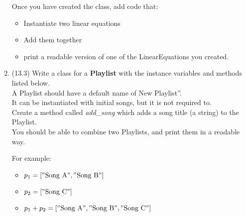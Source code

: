 \documentclass{article}
\newcommand{\csq}[1]{\reflectbox{''}#1''}  %
\newcommand{\csqt}[1]{\text{\reflectbox{''}#1''}}  %
\begin{document}
\begin{enumerate}
		Once you have created the class, add code that:
		\begin{itemize}
			\item Instantiate two linear equations
			\item Add them together
			\item print a readable version of one of the LinearEquations you created.
		\end{itemize}



\item (13.3) %
		Write a class for a \textbf{Playlist} with the instance variables and methods listed 
		below.\\
		A Playlist should have a default name of \csq{New Playlist}.\\
		It can be instantiated with initial songs, but it is not required to.\\
		Create a method called \textit{add\_song} which adds a song title (a string) to the 
		Playlist.\\
		You should be able to combine two Playlists, and print them in a readable way.
			
		\begin{minipage}[t]{0.65\textwidth}
			For example:
			\begin{itemize}
				\item $p_1 = [\csqt{Song A}, \csqt{Song B}]$
				\item $p_2 = [\csqt{Song C}]$
				\item $p_1 + p_2 = [\csqt{Song A}, \csqt{Song B}, \csqt{Song C}]$
			\end{itemize}


\end{minipage}
\end{enumerate}
\end{document}
